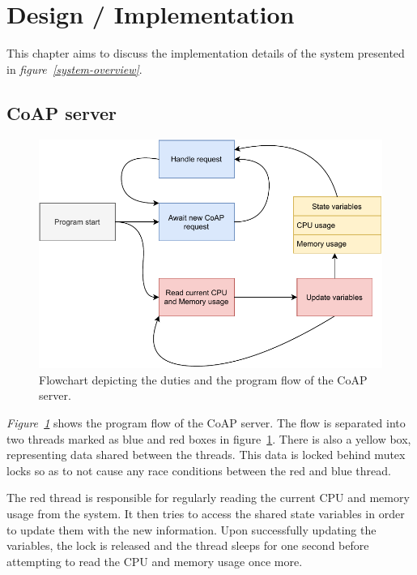 \section{Design / Implementation}
\label{ch:impl}
\noindent	

This chapter aims to discuss the implementation details of the system presented in \textit{figure~\ref{system-overview}}.

\subsection{CoAP server}

\begin{figure}[H]
	\begin{center}
		\includegraphics[width=\textwidth]{./doc/coap_flowchart.pdf}
		\caption{Flowchart depicting the duties and the program flow of the CoAP server.}
		\label{coap-figure}
	\end{center}
\end{figure}

\textit{Figure~\ref{coap-figure}} shows the program flow of the CoAP server. The flow is separated into two threads marked as blue and red boxes in figure~\ref{coap-figure}. There is also a yellow box, representing data shared between the threads. This data is locked behind mutex locks so as to not cause any race conditions between the red and blue thread. 

The red thread is responsible for regularly reading the current CPU and memory usage from the system. It then tries to access the shared state variables in order to update them with the new information. Upon successfully updating the variables, the lock is released and the thread sleeps for one second before attempting to read the CPU and memory usage once more.

